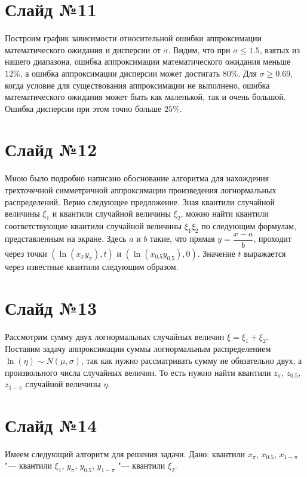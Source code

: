 \documentclass[specialist, substylefile = spbu.rtx,
subf,href,colorlinks=true, 12pt]{disser}
\begin{document}
\section*{Слайд №11}

	Построим график зависимости относительной ошибки аппроксимации математического ожидания и дисперсии  от $\sigma$. Видим, что при $\sigma\leq1.5$, взятых из нашего диапазона, ошибка аппроксимации математического ожидания меньше $12\%$, а ошибка аппроксимации дисперсии может достигать $80\%$. Для $\sigma\geq 0.69$, когда условие для существования аппроксимации не выполнено, ошибка математического ожидания может быть как маленькой, так и очень большой. Ошибка дисперсии при этом точно больше $25\%$.

\section*{Слайд №12}

Мною было подробно написано обоснование алгоритма для нахождения трехточечной симметричной аппроксимации произведения логнормальных распределений. Верно следующее предложение. Зная квантили случайной величины $\xi_{1}$ и квантили случайной величины $\xi_{2}$, можно найти квантили соответствующие квантили случайной величины $\xi_{1}\xi_{2}$ по следующим формулам, представленным на экране. Здесь $a$ и $b$ такие, что прямая $y=\dfrac{x-a}{b}$, проходит через точки $(\ln(x_{\pi}y_{\pi}), t)$ и $(\ln(x_{0.5}y_{0.5}),0)$. Значение $t$ выражается через известные квантили следующим образом.

\section*{Слайд №13}

Рассмотрим сумму двух логнормальных случайных величин $\xi = \xi_{1}+\xi_{2}$. Поставим задачу аппроксимации суммы логнормальным распределением $\ln(\eta)\sim N(\mu, \sigma)$, так как нужно рассматривать сумму не обязательно двух, а произвольного числа случайных величин. То есть нужно найти квантили $z_{\pi}$, $z_{0.5}$, $z_{1-\pi}$ случайной величины $\eta$.

\section*{Слайд №14}

Имеем следующий алгоритм для решения задачи. Дано: квантили $x_{\pi}$, $x_{0.5}$, $x_{1-\pi}$ "--- квантили $\xi_{1}$, $y_{\pi}$, $y_{0.5}$, $y_{1-\pi}$ "--- квантили $\xi_{2}$.
\end{document}
